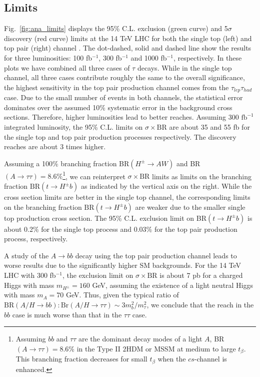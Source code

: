 \subsection{Limits}
\label{sec:ana_limits}

Fig.~\ref{fig:ana_limits} displays the 95\% C.L. exclusion (green curve) and 5$\sigma$ discovery (red curve) limits at the 14 TeV LHC for both the single top (left) and top pair (right) channel . The dot-dashed, solid and dashed line show the results for three luminosities: 100 fb$^{-1}$, 300 fb$^{-1}$ and 1000 fb$^{-1}$, respectively. In these plots we have combined all three cases of $\tau$ decays. While in the single top channel, all three cases contribute roughly the same to the overall significance, the highest sensitivity in the top pair production channel comes from the $\tau_{lep}\tau_{had}$ case. Due to the small number of events in both channels, the statistical error dominates over the assumed 10\% systematic error in the background cross sections. Therefore, higher luminosities lead to better reaches. Assuming 300 $\text{fb}^{-1}$ integrated luminosity, the 95\% C.L. limits on $\sigma\times\text{BR}$ are about 35 and 55 fb for the single top and top pair production processes respectively. The discovery reaches are about 3 times higher. 

Assuming a 100\% branching fraction BR$(H^{\pm} \rightarrow A W )$ and BR$(A \rightarrow \tau\tau)=8.6\%$\footnote{Assuming $bb$ and $\tau\tau$ are the dominant decay modes of a light $A$, BR$(A \rightarrow \tau\tau)=8.6$\% in the Type II $2$HDM or MSSM at medium to large $t_{\beta}$. This branching fraction decreases for small $t_{\beta}$ when the $cs$-channel is enhanced.}, we can reinterpret $\sigma\times\text{BR}$ limits as limits on the branching fraction $\text{BR}(t \rightarrow H^{\pm} b)$ as indicated by the vertical axis on the right. While the cross section limits are better in the single top channel, the corresponding limits on the branching fraction $\text{BR}(t \rightarrow H^{\pm} b)$ are weaker due to the smaller single top production cross section. The 95\% C.L. exclusion limit on BR$(t \rightarrow H^{\pm} b)$ is about 0.2\% for the single top process and 0.03\% for the top pair production process, respectively.

A study of the $A \rightarrow bb$ decay using the top pair production channel leads to worse results due to the significantly higher SM backgrounds. For the 14 TeV LHC with 300 fb$^{-1}$, the exclusion limit on $\sigma \times \text{BR}$ is about 7 pb for a charged Higgs with mass $m_{H^{\pm}} = 160$ GeV, assuming the existence of a light neutral Higgs with mass $m_A=70$ GeV. Thus, given the typical ratio of $\text{BR}(A/H \rightarrow bb) : \text{Br}(A/H\rightarrow \tau\tau) \sim 3m^2_b/m^2_{\tau}$, we conclude that the reach in the $bb$ case is much worse than that in the $\tau\tau$ case.

